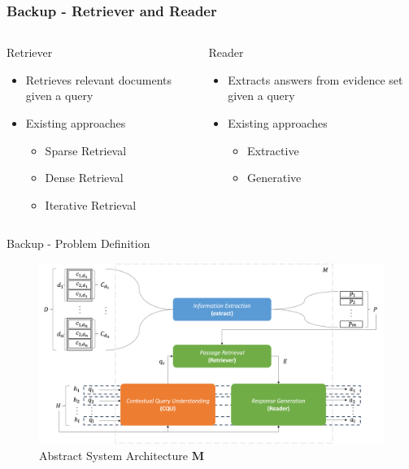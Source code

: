 \documentclass{beamer}
\begin{document}
\begin{frame}
  \frametitle{Backup - Retriever and Reader}

  \begin{columns}[t]
    \begin{column}{.5\textwidth}
    {\color{unirot}Retriever}
    \begin{itemize}
      \item Retrieves relevant documents given a query
      \item Existing approaches
      \begin{itemize}
        \item Sparse Retrieval
        \item Dense Retrieval
        \item Iterative Retrieval
      \end{itemize}
    \end{itemize}
    \end{column}
    \begin{column}{.5\textwidth}
    {\color{unirot}Reader}
    \begin{itemize}
      \item Extracts answers from evidence set given a query
      \item Existing approaches
      \begin{itemize}
        \item Extractive
        \item Generative
      \end{itemize}
    \end{itemize}
    \end{column}
  \end{columns}

\end{frame}


\begin{frame}{Backup - Problem Definition}

  \begin{figure}
    \includegraphics[width=\textwidth]{Grafiken/conrag_konzeptionell.png}
    \caption{Abstract System Architecture $\mathbf{M}$}
  \end{figure}
  
\end{frame}
\end{document}
